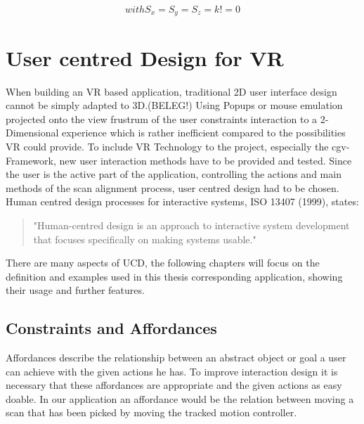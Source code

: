 \documentclass[hyperref,english,bachelorofscience,bibnum]{cgvpub}
\begin{document}
\[
with S_x = S_y = S_z = k != 0
\]
\section{User centred Design for VR}

When building an VR based application, traditional 2D user interface design cannot be simply adapted to 3D.(BELEG!)
Using Popups or mouse emulation projected onto the view frustrum of the user constraints interaction to a 2-Dimensional experience which is rather inefficient compared to the possibilities VR could provide.
To include VR Technology to the project, especially the cgv-Framework, new user interaction methods have to be provided and tested. Since the user is the active part of the application, controlling the actions and main methods of the scan alignment process, user centred design had to be chosen. 
Human centred design processes for interactive systems, ISO 13407 (1999), states: 
\begin{quote}
"Human-centred design is an approach to interactive system development that focuses specifically on making systems usable."\cite{w3ucdISO}
\end{quote}
There are many aspects of UCD, the following chapters will focus on the definition and examples used in this thesis corresponding application, showing their usage and further features.

\subsection{Constraints and Affordances}

Affordances describe the relationship between an abstract object or goal a user can achieve with the given actions he has\cite{Jerald2015}.
To improve interaction design it is necessary that these affordances are appropriate and the given actions as easy doable\cite{Jerald2015}.
In our application an affordance would be the relation between moving a scan that has been picked by moving the tracked motion controller. 
\end{document}
